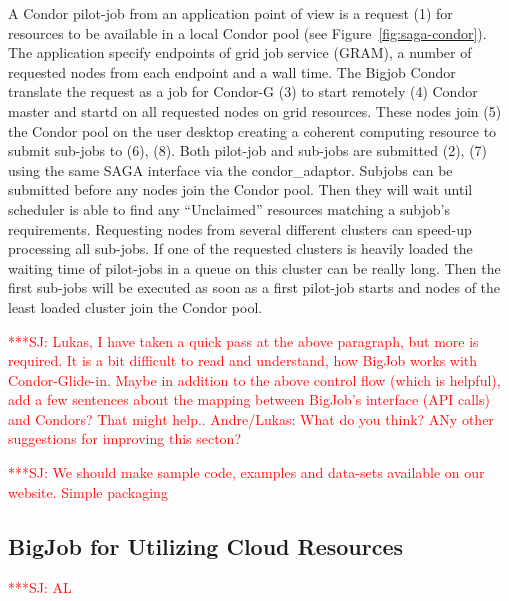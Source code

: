 \documentclass[conference,final]{IEEEtran}
\newcommand{\jhanote}[1]{ {\textcolor{red} { ***SJ: #1 }}}
\newcommand{\jhanote}[1]{}
\begin{document}
A Condor pilot-job from an application point of view is a request (1)
for resources to be available in a local Condor pool (see
Figure~\ref{fig:saga-condor}).  The application specify endpoints of
grid job service (GRAM), a number of requested nodes from each
endpoint and a wall time. The Bigjob Condor translate the request as a
job for Condor-G (3) to start remotely (4) Condor master and startd on
all requested nodes on grid resources. These nodes join (5) the Condor
pool on the user desktop creating a coherent computing resource to
submit sub-jobs to (6), (8). Both pilot-job and sub-jobs are submitted
(2), (7) using the same SAGA interface via the
condor\_adaptor. Subjobs can be submitted before any nodes join the
Condor pool. Then they will wait until scheduler is able to find any
“Unclaimed” resources matching a subjob's requirements. Requesting
nodes from several different clusters can speed-up processing all
sub-jobs. If one of the requested clusters is heavily loaded the
waiting time of pilot-jobs in a queue on this cluster can be really
long. Then the first sub-jobs will be executed as soon as a first
pilot-job starts and nodes of the least loaded cluster join the Condor
pool.

\jhanote{Lukas, I have taken a quick pass at the above paragraph, but
  more is required. It is a bit difficult to read and understand, how
  BigJob works with Condor-Glide-in. Maybe in addition to the above
  control flow (which is helpful), add a few sentences about the
  mapping between BigJob's interface (API calls) and Condors? That
  might help.. Andre/Lukas: What do you think? ANy other suggestions
  for improving this secton?}

\jhanote{We should make sample code, examples and data-sets available
  on our website. Simple packaging}

\subsection{BigJob for Utilizing Cloud Resources} \jhanote{AL}

\end{document}

